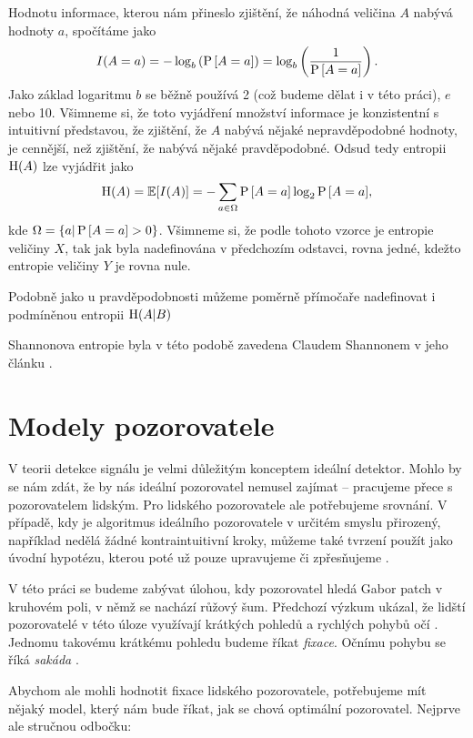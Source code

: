 Hodnotu informace, kterou nám přineslo zjištění, že náhodná veličina $A$ nabývá
hodnoty $a$, spočítáme jako $$I(A=a)=-\log_b\left({\P{A=a}}\right)=\log_b\left(\frac1{\P{A=a}}\right).$$ Jako
základ logaritmu $b$ se běžně používá 2 (což budeme dělat i v této práci), $e$
nebo 10. Všimneme si, že toto vyjádření množství informace je konzistentní s
intuitivní představou, že zjištění, že $A$ nabývá nějaké nepravděpodobné
hodnoty, je cennější, než zjištění, že nabývá nějaké pravděpodobné. Odsud tedy
entropii $\H(A)$ lze vyjádřit jako $$\H(A)=\mathbb{E}[I(A)]=-\displaystyle\sum_{a
\in \Omega}\P{A=a}\log_2{\P{A=a}},$$ kde $\Omega = \{a|\P{A=a} > 0\}$.
Všimneme si, že podle tohoto vzorce je entropie veličiny $X$, tak jak byla
nadefinována v předchozím odstavci, rovna jedné, kdežto  entropie veličiny $Y$
je rovna nule.

Podobně jako u pravděpodobnosti můžeme poměrně přímočaře nadefinovat i   
podmíněnou entropii $\H(A| B)$

Shannonova entropie byla v této podobě zavedena Claudem Shannonem v jeho článku \citeyearpar{Entropie}. 

\section{Modely pozorovatele}

V teorii detekce signálu je velmi důležitým konceptem ideální detektor.
Mohlo by se nám zdát, že by nás ideální pozorovatel nemusel zajímat -- pracujeme
přece s pozorovatelem lidským. Pro lidského pozorovatele ale potřebujeme srovnání.
V případě, kdy je algoritmus ideálního pozorovatele v určitém smyslu
přirozený, například nedělá žádné kontraintuitivní kroky, můžeme také tvrzení
 použít jako úvodní hypotézu, kterou
poté už pouze upravujeme či zpřesňujeme \citep{GreenSDT}.

V této práci se budeme zabývat úlohou, kdy pozorovatel hledá Gabor patch v
kruhovém poli, v němž se nachází růžový šum. Předchozí výzkum ukázal, že lidští
pozorovatelé v této úloze využívají krátkých pohledů a rychlých pohybů očí \citep{Najemnik05}.
Jednomu takovému krátkému pohledu budeme říkat \emph{fixace}. Očnímu pohybu
se říká \emph{sakáda} \citep{sakady}.
 
Abychom ale mohli hodnotit fixace lidského pozorovatele, potřebujeme mít nějaký
model, který nám bude říkat, jak se chová optimální pozorovatel. Nejprve ale
stručnou odbočku:

